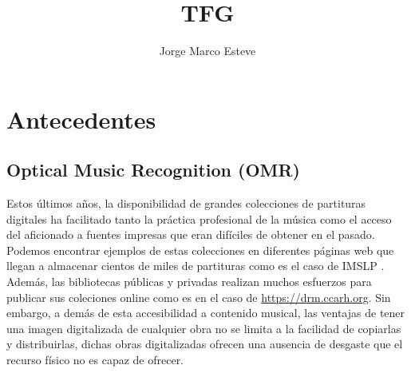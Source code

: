 \documentclass{article}
\title{TFG}
\author{Jorge Marco Esteve}
\begin{document}
\maketitle

\section{Antecedentes}

\subsection{Optical Music Recognition (OMR)}

Estos últimos años, la disponibilidad de grandes colecciones de partituras digitales ha facilitado tanto la práctica
profesional de la música como el acceso del aficionado a fuentes impresas que eran difíciles de obtener en el pasado.
Podemos encontrar ejemplos de estas colecciones en diferentes páginas web que llegan a almacenar cientos de miles de partituras
como es el caso de IMSLP . Además, las bibliotecas públicas y privadas realizan muchos esfuerzos para publicar sus coleciones
online como es en el caso de \url{https://drm.ccarh.org}. Sin embargo, a demás de esta accesibilidad a contenido musical, las
ventajas de tener una imagen digitalizada de cualquier obra no se limita a la facilidad de copiarlas y distribuirlas, dichas obras 
digitalizadas ofrecen una ausencia de desgaste que el recurso físico no es capaz de ofrecer.
\end{document}
